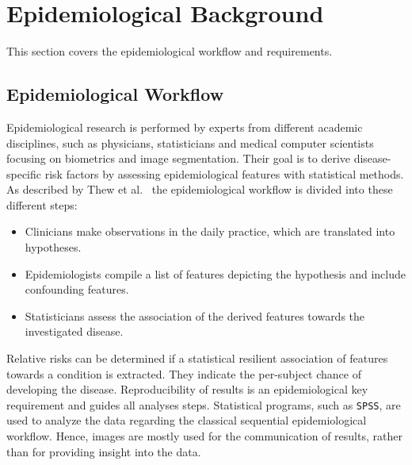 \documentclass[journal]{style/vgtc} 			          %
\begin{document}
\section{Epidemiological Background} \label{sec:Background}
This section covers the epidemiological workflow and requirements.
\subsection{Epidemiological Workflow} \label{EpidemiologicalWorkflow}
Epidemiological research is performed by experts from different academic disciplines, such as physicians, statisticians and medical computer scientists focusing on biometrics and image segmentation.
Their goal is to derive disease-specific risk factors by assessing epidemiological features with statistical methods.
As described by Thew et al.~\cite{Thew2009} the epidemiological workflow is divided into these different steps:
\begin{itemize}
	\item Clinicians make observations in the daily practice, which are translated into hypotheses.
	\item Epidemiologists compile a list of features depicting the hypothesis and include confounding features.
	\item Statisticians assess the association of the derived features towards the investigated disease.
\end{itemize}
Relative risks can be determined if a statistical resilient association of features towards a condition is extracted.
They indicate the per-subject chance of developing the disease.
Reproducibility of results is an epidemiological key requirement and guides all analyses steps.
Statistical programs, such as \texttt{SPSS}, are used to analyze the data regarding the classical sequential epidemiological workflow. Hence, images are mostly used for the communication of results, rather than for providing insight into the data.
\end{document}
